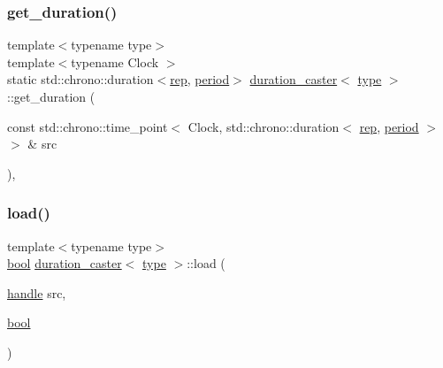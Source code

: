 \mbox{\label{classduration__caster_aed28187c877e7c2e084ba5c1c4d0f9be}} 
\subsubsection{\texorpdfstring{get\_duration()}{get\_duration()}\hspace{0.1cm}{\footnotesize\ttfamily [2/2]}}
{\footnotesize\ttfamily template$<$typename type$>$ \\
template$<$typename Clock $>$ \\
static std\+::chrono\+::duration$<$\mbox{\hyperlink{classduration__caster_aa56a3f1e4b4c1651fbe0b52f9575e1bd}{rep}}, \mbox{\hyperlink{classduration__caster_ac22f4732d7e0b975d5c5d2e82a7635c4}{period}}$>$ \mbox{\hyperlink{classduration__caster}{duration\+\_\+caster}}$<$ \mbox{\hyperlink{_s_d_l__opengl_8h_ad5ddf6fca7b585646515660e810e0188}{type}} $>$\+::get\+\_\+duration (\begin{DoxyParamCaption}\item[{const std\+::chrono\+::time\+\_\+point$<$ Clock, std\+::chrono\+::duration$<$ \mbox{\hyperlink{classduration__caster_aa56a3f1e4b4c1651fbe0b52f9575e1bd}{rep}}, \mbox{\hyperlink{classduration__caster_ac22f4732d7e0b975d5c5d2e82a7635c4}{period}} $>$$>$ \&}]{src }\end{DoxyParamCaption})\hspace{0.3cm}{\ttfamily [inline]}, {\ttfamily [static]}}

\mbox{\label{classduration__caster_ac5394869ec7d87be76a8cd574d76f3a4}} 
\subsubsection{\texorpdfstring{load()}{load()}}
{\footnotesize\ttfamily template$<$typename type$>$ \\
\mbox{\hyperlink{asdl_8h_af6a258d8f3ee5206d682d799316314b1}{bool}} \mbox{\hyperlink{classduration__caster}{duration\+\_\+caster}}$<$ \mbox{\hyperlink{_s_d_l__opengl_8h_ad5ddf6fca7b585646515660e810e0188}{type}} $>$\+::load (\begin{DoxyParamCaption}\item[{\mbox{\hyperlink{classhandle}{handle}}}]{src,  }\item[{\mbox{\hyperlink{asdl_8h_af6a258d8f3ee5206d682d799316314b1}{bool}}}]{ }\end{DoxyParamCaption})\hspace{0.3cm}{\ttfamily [inline]}}

